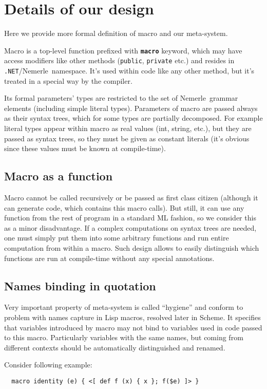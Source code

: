 \documentclass{llncs}
\newcommand{\net}[0]{{\tt .NET}}
\newcommand{\nem}[0]{Nemerle}
\newcommand{\kw}[1]{{\tt \bf #1}}
\begin{document}
\section{Details of our design}
Here we provide more formal definition of macro and our meta-system.

Macro is a top-level function prefixed with \kw{macro} keyword, which may 
have access modifiers like other methods (\verb,public,, \verb,private, etc.) 
and resides in \net/\nem\ namespace. It's used within code like
any other method, but it's treated in a special way by the compiler.

Its formal parameters' types are restricted to the set of \nem\
grammar elements (including simple literal types). Parameters of 
macro are passed always as their syntax trees, which for some
types are partially decomposed. For example literal types appear
within macro as real values (int, string, etc.), but they are passed
as syntax trees, so they must be given as constant literals (it's
obvious since these values must be known at compile-time).

\subsection{Macro as a function}
Macro cannot be called recursively or be passed as first class citizen
(although it can generate code, which contains this macro calls).
But still, it can use any function from the rest of program in a standard ML
fashion, so we consider this as a minor disadvantage. If a complex 
computations on syntax trees are needed, one must simply put them 
into some arbitrary functions and run entire computation from within a macro. 
Such design allows to easily distinguish which functions are run at
compile-time without any special annotations.

\subsection{Names binding in quotation}
Very important property of meta-system is called ``hygiene'' and conform
to problem with names capture in Lisp macros, resolved later in Scheme.
It specifies that variables introduced by macro may not bind to variables 
used in code passed to this macro. Particularly variables with the same names, 
but coming from different contexts should be automatically distinguished and 
renamed.
 
Consider following example:

\begin{verbatim}
  macro identity (e) { <[ def f (x) { x }; f($e) ]> }
\end{verbatim} %
\end{document}
